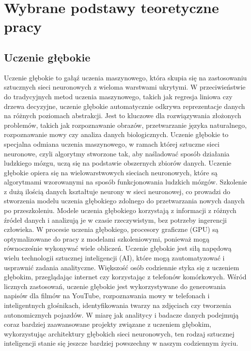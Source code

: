 \chapter{Wybrane podstawy teoretyczne pracy}

\section{Uczenie głębokie}
Uczenie głębokie to gałąź uczenia maszynowego, która skupia się na zastosowaniu sztucznych sieci neuronowych z wieloma warstwami ukrytymi. W przeciwieństwie do tradycyjnych metod uczenia maszynowego, takich jak regresja liniowa czy drzewa decyzyjne, uczenie głębokie automatycznie odkrywa reprezentacje danych na różnych poziomach abstrakcji. Jest to kluczowe dla rozwiązywania złożonych problemów, takich jak rozpoznawanie obrazów, przetwarzanie języka naturalnego, rozpoznawanie mowy czy analiza danych biologicznych. 
Uczenie głębokie to specjalna odmiana uczenia maszynowego, w ramach której sztuczne sieci neuronowe, czyli algorytmy stworzone tak, aby naśladować sposób działania ludzkiego mózgu, uczą się na podstawie obszernych zbiorów danych. Uczenie głębokie opiera się na wielowarstwowych sieciach neuronowych, które są algorytmami wzorowanymi na sposób funkcjonowania ludzkich mózgów. Szkolenie z dużą ilością danych kształtuje neurony w sieci neuronowej, co prowadzi do stworzenia modelu uczenia głębokiego zdolnego do przetwarzania nowych danych po przeszkoleniu. Modele uczenia głębokiego korzystają z informacji z różnych źródeł danych i analizują je w czasie rzeczywistym, bez potrzeby ingerencji człowieka. W procesie uczenia głębokiego, procesory graficzne (GPU) są optymalizowane do pracy z modelami szkoleniowymi, ponieważ mogą równocześnie wykonywać wiele obliczeń.
Uczenie głębokie jest siłą napędową wielu technologii sztucznej inteligencji (AI), które mogą zautomatyzować i usprawnić zadania analityczne. Większość osób codziennie styka się z uczeniem głębokim, przeglądając internet czy korzystając z telefonów komórkowych. Wśród licznych zastosowań, uczenie głębokie jest wykorzystywane do generowania napisów dla filmów na YouTube, rozpoznawania mowy w telefonach i inteligentnych głośnikach, identyfikowania twarzy na zdjęciach czy tworzenia autonomicznych pojazdów. W miarę jak analitycy i badacze danych podejmują coraz bardziej zaawansowane projekty związane z uczeniem głębokim, wykorzystując architektury głębokich sieci neuronowych, ten rodzaj sztucznej inteligencji stanie się jeszcze bardziej powszechny w naszym codziennym życiu.


